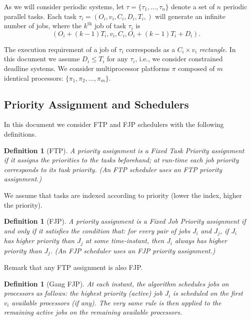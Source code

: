 \documentclass[a4paper]{article}
\newtheorem{definition}[theorem]{Definition}
\begin{document}
As we will consider periodic systems, let $\tau = \{\tau_{1}, \ldots, \tau_{n}\}$ denote a set of $n$ periodic parallel tasks. Each task $\tau_{i} = (O_{i}, v_{i}, C_{i}, D_{i}, T_{i},)$ will generate an infinite number of jobs, where the $k^\text{th}$ job of task $\tau_i$ is 
$$(O_i+ (k-1)T_i, v_i, C_i, O_i+ (k-1)T_i+D_i).$$

The execution requirement of a job of $\tau_{i}$ corresponds as a $C_{i} \times v_{i}$ \emph{rectangle}.
In this document we assume $D_{i} \leq T_{i}$ for any $\tau_{i}$, i.e., we consider constrained deadline systems. We consider multiprocessor platforms $\pi$ composed of $m$ identical processors: $\{\pi_1, \pi_2, \ldots, \pi_m \}$. 




\subsection{Priority Assignment and Schedulers}

In this document we consider FTP and FJP schedulers with the following definitions.

\begin{definition}[FTP]
  A priority assignment  is a \emph{Fixed Task Priority}  assignment if it assigns the priorities to the tasks beforehand; at  run-time each job priority corresponds to its task priority. (An FTP scheduler uses an FTP priority assignment.)
\end{definition}

We assume that tasks are indexed according to priority (lower the index, higher the priority). 

\begin{definition}[FJP]
A priority assignment is a \emph{Fixed Job Priority}  assignment if and only if it satisfies the condition that: for every pair of jobs $J_i$ and $J_j$, if $J_i$ has higher priority than $J_j$ at some time-instant, then $J_i$ always has higher priority than $J_j$. (An FJP scheduler uses an FJP priority assignment.) 
\end{definition}

Remark that any FTP assignment is also FJP.



\begin{definition}[Gang FJP] At each instant, the algorithm schedules jobs on processors as follows: the highest priority (active) job $J_i$ is scheduled on the first $v_{i}$ available processors (if any). The very same rule is then applied to the remaining active jobs on the remaining available processors.
\end{definition}
\end{document}
